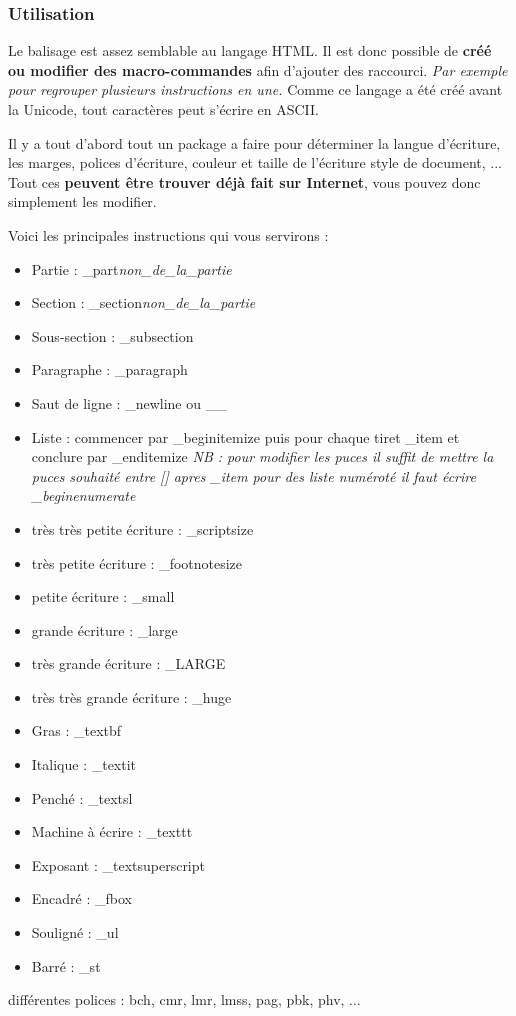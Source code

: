 \subsubsection{Utilisation}

Le balisage est assez semblable au langage HTML. Il est donc possible de \textbf{créé ou modifier des macro-commandes} afin d'ajouter des raccourci. \textit{Par exemple pour regrouper plusieurs instructions en une.}
Comme ce langage a été créé avant la Unicode, tout caractères peut s'écrire en ASCII. 

Il y a tout d'abord tout un package a faire pour déterminer la langue d’écriture, les marges, polices d’écriture, couleur et taille de l’écriture style de document, ...
Tout ces \textbf{peuvent être trouver déjà fait sur Internet}, vous pouvez donc simplement les modifier.


Voici les principales instructions qui vous servirons : 
\begin{itemize}
\item Partie : \_part{\textit{non_de_la_partie}}
\item Section : \_section{\textit{non_de_la_partie}}
\item Sous-section : \_subsection{}
\item Paragraphe : \_paragraph{}
\end{itemize}

\begin{itemize}
\item Saut de ligne : \_newline ou \_\_
\item Liste : commencer par \_begin{itemize} puis pour chaque tiret \_item et conclure par \_end{itemize}
 \textit{NB : pour modifier les puces il suffit de mettre la puces souhaité entre [] apres \_item
	pour des liste numéroté il faut écrire \_begin{enumerate} }
\end{itemize} 

\begin{itemize}
\item très très petite écriture : \_scriptsize
\item très petite écriture : \_footnotesize
\item petite écriture : \_small
\item grande écriture : \_large
\item très grande écriture : \_LARGE
\item très très grande écriture : \_huge
\end{itemize}

\begin{itemize}
\item Gras : \_textbf{}
\item Italique : \_textit{}
\item Penché : \_textsl{}
\item Machine à écrire : \_texttt{}
\item Exposant : \_textsuperscript{}
\item Encadré : \_fbox{}
\item Souligné : \_ul{}
\item Barré : \_st{}
\end{itemize}
différentes polices : bch, cmr, lmr, lmss, pag, pbk, phv, ...
